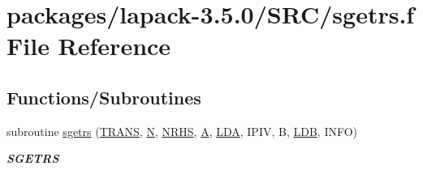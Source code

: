 \hypertarget{sgetrs_8f}{}\section{packages/lapack-\/3.5.0/\+S\+R\+C/sgetrs.f File Reference}
\label{sgetrs_8f}
\subsection*{Functions/\+Subroutines}
\begin{DoxyCompactItemize}
\item 
subroutine \hyperlink{group__realGEcomputational_gaa00bcf4d83a118cb6f0b6619d6ffaa24}{sgetrs} (\hyperlink{superlu__enum__consts_8h_a0c4e17b2d5cea33f9991ccc6a6678d62a1f61e3015bfe0f0c2c3fda4c5a0cdf58}{T\+R\+A\+N\+S}, \hyperlink{polmisc_8c_a0240ac851181b84ac374872dc5434ee4}{N}, \hyperlink{example__user_8c_aa0138da002ce2a90360df2f521eb3198}{N\+R\+H\+S}, \hyperlink{classA}{A}, \hyperlink{example__user_8c_ae946da542ce0db94dced19b2ecefd1aa}{L\+D\+A}, I\+P\+I\+V, B, \hyperlink{example__user_8c_a50e90a7104df172b5a89a06c47fcca04}{L\+D\+B}, I\+N\+F\+O)
\begin{DoxyCompactList}\small\item\em {\bfseries S\+G\+E\+T\+R\+S} \end{DoxyCompactList}\end{DoxyCompactItemize}
